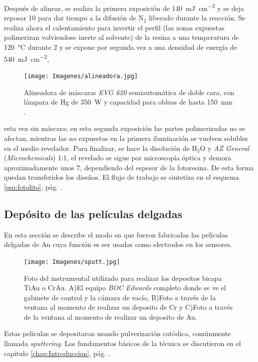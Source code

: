 		Después de alinear, se realiza la primera exposición de \SI{140}{mJ.\cm^{-2}} y se deja reposar \SI{10}{\min} para dar tiempo a la difusión de N$_2$ liberado durante la reacción. Se realiza ahora el calentamiento para invertir el perfil (las zonas expuestas polimerizan volviendose inerte al solvente) de la resina a una temperatura de \SI{120}{\celsius} durante \SI{2}{\min}  y se expone por segunda vez a una densidad de energía de \SI{540}{mJ.cm^{-2}},
		\begin{figure}[ht]
			  \begin{center}
			  \texttt{[image: Imagenes/alineadora.jpg]}
			  \caption[Alineadora de máscaras]{Alineadora de máscaras \textit{EVG 620} semiautomática de doble cara, con lámpara de Hg de \SI{350}{W}  y capacidad para obleas de hasta \SI{150}{\mm} .}
			  \label{fig:alineadora}
			  \end{center}
			  \end{figure}	
		esta vez sin máscara; en esta segunda exposición las partes polimerizadas no se afectan, mientras las no expuestas en la primera iluminación se vuelven solubles en el medio revelador. Para finalizar, se hace la disolución de H$_2$O y \textit{AZ General} (\textit{Microchemicals}) 1:1, el revelado se sigue por microscopía óptica y demora aproximadamente unos \SI{7}{\min}, dependiendo del espesor de la fotoresina. De esta forma quedan transferidos los diseños. El flujo de trabajo se sintetiza en el esquema \ref{esq:fotolito}, pág. \pageref{esq:fotolito}.

	\subsection{Depósito de las películas delgadas}\label{sec:sputt}

			En esta sección se describe el modo en que fueron fabricadas las películas delgadas de Au cuya función es ser usadas como electrodos en los sensores. 
				  \begin{figure}[t!]
				  \begin{center}
				  \texttt{[image: Imagenes/sputt.jpg]}
				  \caption[Equipo para depósito de películas delgadas, \textit{sputtering}]{Foto del instrumental utilizado para realizar los depositos bicapa Ti\textbar Au o Cr\textbar Au. A)El equipo \textit{BOC Edwards} completo donde se ve el gabinete de control y la cámara de vacío, B)Foto a través de la ventana al momento de realizar un deposito de Cr y C)Foto a través de la ventana al momento de realizar un deposito de Au.}
				  \label{fig:sputt}
				  \end{center}
				  \end{figure}	
			Estas películas se depositaron usando pulverización catódica, comúnmente llamada \textit{sputtering}\cite{sigmund1968}. Los fundamentos básicos de la técnica se discutieron en el capitulo \ref{chap:Introduccion}, pág. \pageref{sec:microfabricacion}.


